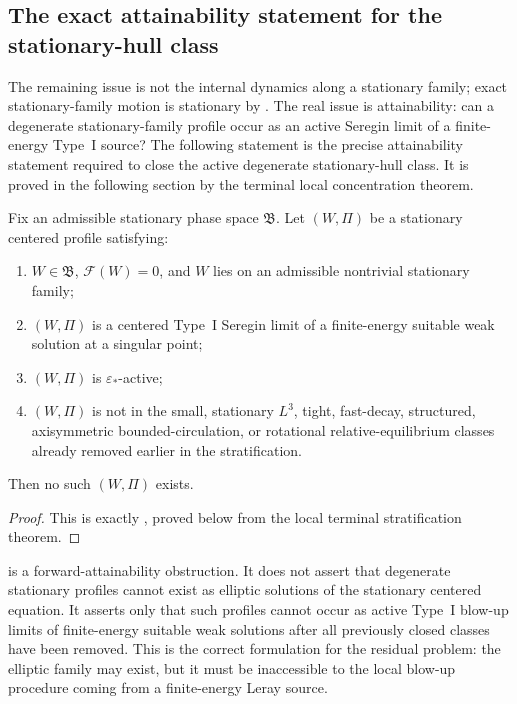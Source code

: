 \subsection{The exact attainability statement for the stationary-hull class}

The remaining issue is not the internal dynamics along a stationary family; exact
stationary-family
motion is stationary by .  The real
issue is attainability: can a degenerate stationary-family profile occur as an
active Seregin limit of a finite-energy Type~I source?  The following statement
is the precise attainability statement required to close the active
degenerate stationary-hull class.  It is proved in the following section by
the terminal local concentration theorem.

\begin{theorem}
\label{thm:R3-no-attainable-degenerate-family}
Fix an admissible stationary phase space \(\mathfrak B\).  Let \((W,\Pi)\) be a
stationary centered profile satisfying:
\begin{enumerate}[label=(\roman*)]
   \item \(W\in\mathfrak B\), \(\mathcal F(W)=0\), and \(W\) lies on an
      admissible nontrivial stationary family;
   \item \((W,\Pi)\) is a centered Type~I Seregin limit of a finite-energy
      suitable weak solution at a singular point;
   \item \((W,\Pi)\) is \(\varepsilon_*\)-active;
   \item \((W,\Pi)\) is not in the small, stationary \(L^3\), tight,
      fast-decay, structured, axisymmetric bounded-circulation, or rotational
      relative-equilibrium classes already removed earlier in the stratification.
\end{enumerate}
Then no such \((W,\Pi)\) exists.
\end{theorem}

\begin{proof}
This is exactly , proved below from
the local terminal stratification theorem.
\end{proof}

\begin{remark}
\label{rem:R3-input-interpretation}
 is a forward-attainability
obstruction.  It does not assert that degenerate stationary profiles cannot
exist as elliptic solutions of the stationary centered equation.  It asserts
only that such profiles cannot occur as active Type~I blow-up limits of
finite-energy suitable weak solutions after all previously closed classes have
been removed.  This is the correct formulation for the residual problem: the
elliptic family may exist, but it must be inaccessible to the local blow-up
procedure coming from a finite-energy Leray source.
\end{remark}

